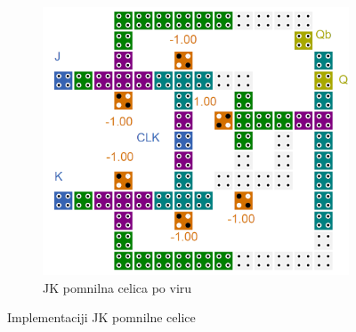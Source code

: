 \documentclass[a4paper, 11pt]{article}
\begin{document}
\begin{figure}[h!]
\begin{subfigure}[b]{0.4\textwidth}
	\includegraphics[width=\textwidth]{../img/vir_5/jk.png} 
	\caption{JK pomnilna celica po viru \cite{a_novel_approach}}
	\label{fig-jk-2}
	\end{subfigure}
	\caption{Implementaciji JK pomnilne celice}
	\label{fig-jk}
\end{figure}
\end{document}
